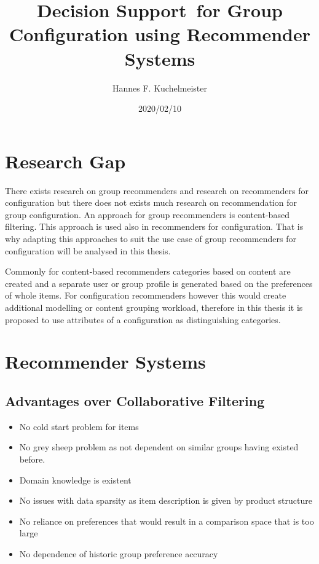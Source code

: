 \documentclass{article}
\begin{document}
\title{Decision Support for Group Configuration using Recommender Systems}
\author{Hannes F. Kuchelmeister}
\date{2020/02/10}

\maketitle

\section{Research Gap}

There exists research on group recommenders and research on recommenders for configuration but there does not exists much research on recommendation for group configuration. An approach for group recommenders is content-based filtering. This approach is used also in recommenders for configuration. That is why adapting this approaches to suit the use case of group recommenders for configuration will be analysed in this thesis.

Commonly for content-based recommenders categories based on content are created and a separate user or group profile is generated based on the preferences of whole items. For configuration recommenders however this would create additional modelling or content grouping workload, therefore in this thesis it is proposed to use attributes of a configuration as distinguishing categories.

\section{Recommender Systems}

\subsection{Advantages over Collaborative Filtering}
\begin{itemize}
    \item No cold start problem for items
    \item No grey sheep problem as not dependent on similar groups having existed before.
    \item Domain knowledge is existent
    \item No issues with data sparsity as item description is given by product structure
    \item No reliance on preferences that would result in a comparison space that is too large
    \item No dependence of historic group preference accuracy 
\end{itemize}
\end{document}
